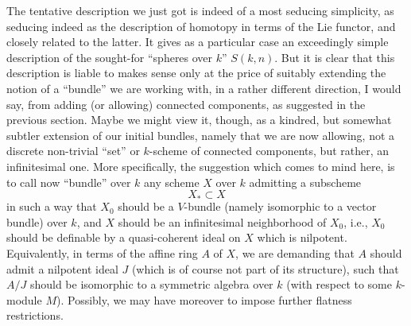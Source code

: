 The tentative description we just got is indeed of a most seducing
simplicity, as seducing indeed as the description of homotopy in terms
of the Lie functor, and closely related to the latter. It gives as a
particular case an exceedingly simple description of the sought-for
``spheres over $k$'' $S(k,n)$. But it is clear that this description
is liable to makes sense only at the price of suitably extending the
notion of a ``bundle'' we are working with, in a rather different
direction, I would say, from adding (or allowing) connected
components, as suggested in the previous section. Maybe we might view
it, though, as a kindred, but somewhat subtler extension of our
initial bundles, namely that we are now allowing, not a discrete
non-trivial ``set'' or $k$-scheme of connected components, but rather,
an infinitesimal one. More specifically, the suggestion which comes to
mind here, is to call now ``bundle'' over $k$ any scheme $X$ over $k$
admitting a subscheme
\[X_*\subset X\]
in such a way that $X_0$ should be a $V$-bundle (namely isomorphic to
a vector bundle) over $k$, and $X$ should be an infinitesimal
neighborhood of $X_0$, i.e., $X_0$ should be definable by a
quasi-coherent ideal on $X$ which is nilpotent. Equivalently, in terms
of the affine ring $A$ of $X$, we are demanding that $A$ should admit
a nilpotent ideal $J$ (which is of course not part of its structure),
such that $A/J$ should be isomorphic to a symmetric algebra over $k$
(with respect to some $k$-module $M$). Possibly, we may have moreover
to impose further flatness restrictions.


